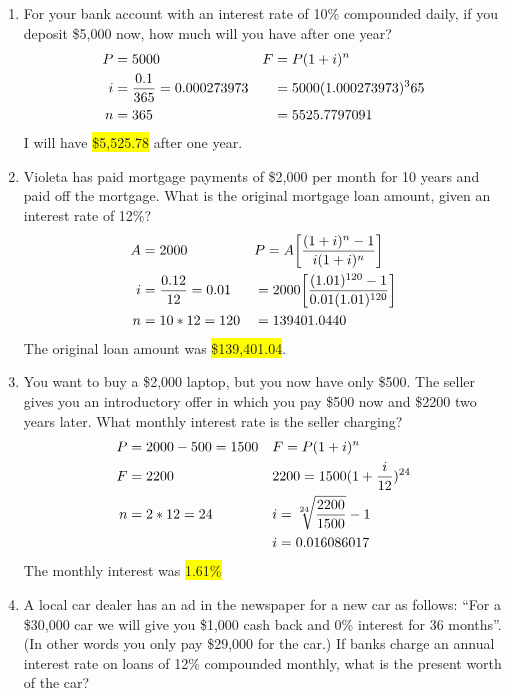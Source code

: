 \documentclass[12pt]{article}
\newcommand{\hilight}[1]{\colorbox{yellow}{#1}}
\begin{document}
\begin{enumerate}[label=\textbf{Q\arabic*}]
\item For your bank account with an interest rate of 10\% compounded daily, if you deposit \$5,000 now, how much will you have after one year?
\begin{align*}
P &= 5000  &\vspace{20pt} F &= P(1+i)^n\\
i &= \frac{0.1}{365} = 0.000273973 & &= 5000(1.000273973)^365\\
n &= 365 & &= 5525.7797091
\end{align*}
I will have \hilight{\$5,525.78} after one year.
\item Violeta has paid mortgage payments of \$2,000 per month for 10 years and paid off the mortgage. What is the original mortgage loan amount, given an interest rate of 12\%?
\begin{align*}
A &= 2000 &\vspace{20pt} &P = A\bigg [ \frac{(1+i)^n -1}{i(1+i)^{n}} \bigg ]\\
i &= \frac{0.12}{12} = 0.01 & &= 2000\bigg [ \frac{(1.01)^{120} -1}{0.01(1.01)^{120}} \bigg ]\\
n &= 10 * 12 = 120 & &= 139401.0440
\end{align*}
The original loan amount was \hilight{\$139,401.04}.
\item You want to buy a \$2,000 laptop, but you now have only \$500. The seller gives you an introductory offer in which you pay \$500 now and \$2200 two years later. What monthly interest rate is the seller charging?
\begin{align*}
P &= 2000-500=1500 &\vspace{20pt} & F=P(1+i)^n\\
F &= 2200 & & 2200= 1500(1 + \frac{i}{12})^{24}\\
n &= 2 * 12 = 24 & &i= \sqrt[24]{\frac{2200}{1500}}-1\\
& & & i = 0.016086017\\
\end{align*}
The monthly interest was \hilight{1.61\%}
\item A local car dealer has an ad in the newspaper for a new car as follows: ``For a \$30,000 car we will give you \$1,000 cash back and 0\% interest for 36 months''. (In other words you only pay \$29,000 for the car.) If banks charge an annual interest rate on loans of 12\% compounded monthly, what is the present worth of the car?
\begin{align*}

\end{align*}
\end{enumerate}
\end{document}
